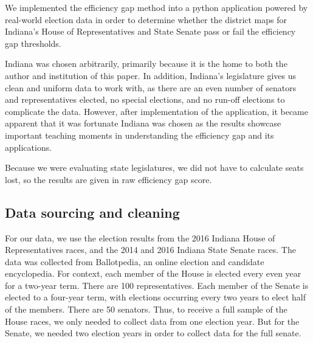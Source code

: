 \documentclass[sigconf]{acmart}
\begin{document}
We implemented the efficiency gap method into a python application powered by real-world election data in order to determine whether the district maps for Indiana's House of Representatives and State Senate pass or fail the efficiency gap thresholds. 

Indiana was chosen arbitrarily, primarily because it is the home to both the author and institution of this paper. In addition, Indiana's legislature gives us clean and uniform data to work with, as there are an even number of senators and representatives elected, no special elections, and no run-off elections to complicate the data. However, after implementation of the application, it became apparent that it was fortunate Indiana was chosen as the results showcase important teaching moments in understanding the efficiency gap and its applications.

Because we were evaluating state legislatures, we did not have to calculate seats lost, so the results are given in raw efficiency gap score. 

\subsection{Data sourcing and cleaning}

For our data, we use the election results from the 2016 Indiana House of Representatives races\cite{houseresults}, and the 2014 and 2016 Indiana State Senate races\cite{senateresults2014}\cite{senateresults2016}. The data was collected from Ballotpedia, an online election and candidate encyclopedia. For context, each member of the House is elected every even year for a two-year term. There are 100 representatives. Each member of the Senate is elected to a four-year term, with elections occurring every two years to elect half of the members. There are 50 senators. Thus, to receive a full sample of the House races, we only needed to collect data from one election year. But for the Senate, we needed two election years in order to collect data for the full senate.
\end{document}
